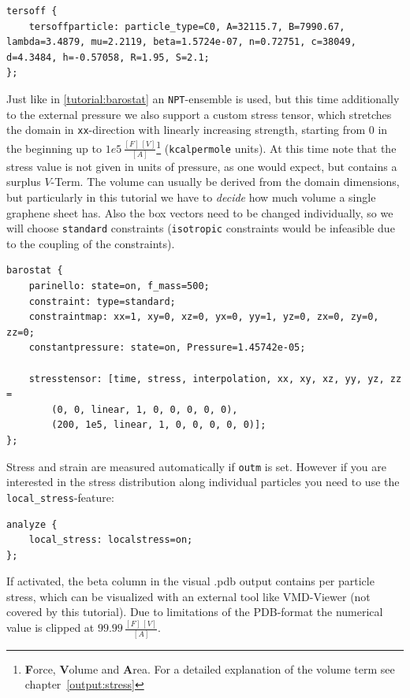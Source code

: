 \begin{lstlisting}
tersoff {
    tersoffparticle: particle_type=C0, A=32115.7, B=7990.67, lambda=3.4879, mu=2.2119, beta=1.5724e-07, n=0.72751, c=38049, d=4.3484, h=-0.57058, R=1.95, S=2.1;
};
\end{lstlisting}

Just like in \ref{tutorial:barostat} an \texttt{NPT}-ensemble is used, but this time
additionally to the external pressure we also support a custom stress tensor,
which stretches the domain in \texttt{xx}-direction with linearly increasing
strength, starting from $0$ in the beginning up to $1e5\,\frac{[F]\,[V]}{[A]}$\footnote{\textbf{F}orce, \textbf{V}olume and \textbf{A}rea.
For a detailed explanation of the volume term see chapter~\ref{output:stress}}
(\texttt{kcalpermole} units). At this time note that the stress value is not
given in units of pressure, as one would expect, but contains a surplus
$V$-Term.  The volume can usually be derived from the domain dimensions, but
particularly in this tutorial we have to \emph{decide} how much volume a single
graphene sheet has. Also the box vectors need to be changed individually, so we
will choose \texttt{standard} constraints (\texttt{isotropic} constraints would be
infeasible due to the coupling of the constraints).

\begin{lstlisting}
barostat {
    parinello: state=on, f_mass=500;
    constraint: type=standard;
    constraintmap: xx=1, xy=0, xz=0, yx=0, yy=1, yz=0, zx=0, zy=0, zz=0;
    constantpressure: state=on, Pressure=1.45742e-05;

    stresstensor: [time, stress, interpolation, xx, xy, xz, yy, yz, zz =
        (0, 0, linear, 1, 0, 0, 0, 0, 0),
        (200, 1e5, linear, 1, 0, 0, 0, 0, 0)];
};
\end{lstlisting}

Stress and strain are measured automatically if \texttt{outm} is set. However
if you are interested in the stress distribution along individual particles you
need to use the \texttt{local\_stress}-feature:

\begin{lstlisting}
analyze {
    local_stress: localstress=on;
};
\end{lstlisting}

If activated, the beta column in the visual .pdb output contains per particle
stress, which can be visualized with an external tool like VMD-Viewer (not
covered by this tutorial). Due to limitations of the PDB-format the numerical
value is clipped at $99.99\,\frac{[F]\,[V]}{[A]}$.

